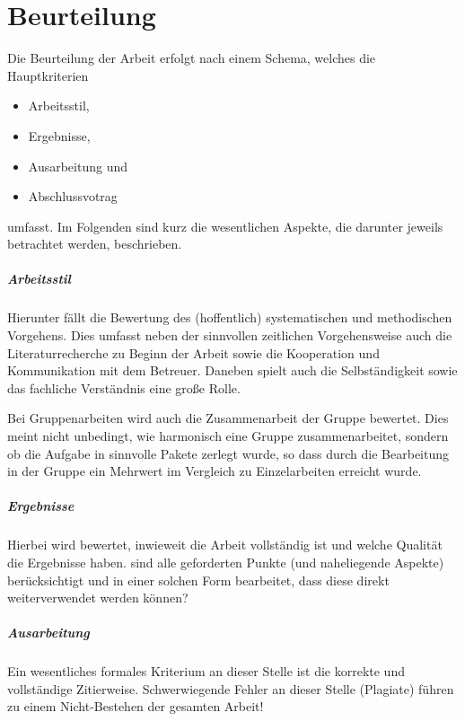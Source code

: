 \chapter{Beurteilung}
\label{cha:Beurteilung}

Die Beurteilung der Arbeit erfolgt nach einem Schema, welches die Hauptkriterien
\begin{itemize}
    \item Arbeitsstil,
    \item Ergebnisse,
    \item Ausarbeitung und
    \item Abschlussvotrag
\end{itemize}
umfasst.
Im Folgenden sind kurz die wesentlichen Aspekte, die darunter jeweils betrachtet werden, beschrieben.


\paragraph{Arbeitsstil}
Hierunter fällt die Bewertung des (hoffentlich) systematischen und methodischen Vorgehens.
Dies umfasst neben der sinnvollen zeitlichen Vorgehensweise auch die Literaturrecherche zu Beginn der Arbeit sowie die Kooperation und Kommunikation mit dem Betreuer.
Daneben spielt auch die Selbständigkeit sowie das fachliche Verständnis eine große Rolle.

Bei Gruppenarbeiten wird auch die Zusammenarbeit der Gruppe bewertet.
Dies meint nicht unbedingt, wie harmonisch eine Gruppe zusammenarbeitet, sondern ob die Aufgabe in sinnvolle Pakete zerlegt wurde, so dass durch die Bearbeitung in der Gruppe ein Mehrwert im Vergleich zu Einzelarbeiten erreicht wurde.


\paragraph{Ergebnisse}
Hierbei wird bewertet, inwieweit die Arbeit vollständig ist und welche Qualität die Ergebnisse haben.
\Dah sind alle geforderten Punkte (und \ggf naheliegende Aspekte) berücksichtigt und in einer solchen Form bearbeitet, dass diese direkt weiterverwendet werden können?


\paragraph{Ausarbeitung}
Ein wesentliches formales Kriterium an dieser Stelle ist die korrekte und vollständige Zitierweise.
Schwerwiegende Fehler an dieser Stelle (Plagiate) führen zu einem Nicht-Bestehen der gesamten Arbeit!

